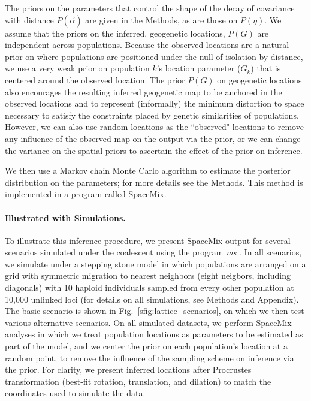 \documentclass[12pt]{article}
\begin{document}
The priors on the parameters that control the shape of the decay of covariance with distance $P(\vec{\alpha})$ are given in the Methods, as are those on $P(\eta)$.  We assume that the priors on the inferred, geogenetic locations, $P(G)$ are independent across populations.  Because the observed locations are a natural prior on where populations are positioned under the null of isolation by distance, we use a very weak prior on population $k$'s location parameter ($G_k$) that is centered around the observed location.
The prior $P(G)$ on geogenetic locations
also encourages the resulting inferred geogenetic map to be anchored in the observed locations and to represent (informally) the minimum distortion to space necessary to satisfy the constraints placed by genetic similarities of populations.  However, we can also use random locations as the ``observed" locations to remove any influence of the observed map on the output via the prior, or we can change the variance on the spatial priors to ascertain the effect of the prior on inference. 

We then use a Markov chain Monte Carlo algorithm to estimate the posterior distribution on the parameters; for more details see the Methods. 
This method is implemented in a program called SpaceMix.

\paragraph{Illustrated with Simulations.} To illustrate this inference procedure, we present SpaceMix output for several scenarios simulated under the coalescent using the program \textit{ms} \citep{Hudson2002}.  In all scenarios, we simulate under a stepping stone model in which populations are arranged on a grid with symmetric migration 
to nearest neighbors (eight neigbors, including diagonals)
with 10 haploid individuals sampled from every other population at 10,000 unlinked loci (for details on all simulations, see Methods and Appendix).  
The basic scenario is shown in Fig.\ \ref{sfig:lattice_scenarios}, 
on which we then test various alternative scenarios.
On all simulated datasets, we perform SpaceMix analyses in which we treat population locations as parameters to be estimated as part of the model, 
and we center the prior on each population's location at a random point, to remove the influence of the sampling scheme on inference via the prior.  
For clarity, we present inferred locations after Procrustes transformation
(best-fit rotation, translation, and dilation) 
to match the coordinates used to simulate the data.
\end{document}
